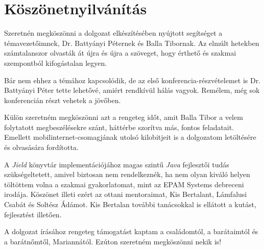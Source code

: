 \chapter*{Köszönetnyilvánítás}

Szeretnén megköszönni a dolgozat elkészítésében nyújtott segítséget a témavezetőimnek, Dr. Battyányi Péternek és Balla Tibornak. Az elmúlt hetekben számtalanszor olvasták át újra és újra a szöveget, hogy érthető és szakmai szempontból kifogástalan legyen. 

Bár nem ehhez a témához kapcsolódik, de az első konferencia-részvételemet is Dr. Battyányi Péter tette lehetővé, amiért rendkívül hálás vagyok. Remélem, még sok konferencián részt vehetek a jövőben.

Külön szeretném megköszönni azt a rengeteg időt, amit Balla Tibor a velem folytatott megbeszélésekre szánt, háttérbe szorítva más, fontos feladatait. Emellett mobilinternet-csomagjának utolsó kilobitjeit is a dolgozatom letöltésére és olvasására fordította.

A \textit{Jield} könyvtár implementációjához magas szintű \textit{Java} fejlesztői tudás szükségeltetett, amivel biztosan nem rendelkeznék, ha nem olyan kiváló helyen töltöttem volna a szakmai gyakorlatomat, mint az EPAM Systems debreceni irodája. Köszönet illeti ezért az ottani mentoraimat, Kis Bertalant, Lámfalusi Csabát és Soltész Ádámot. Kis Bertalan további tanácsokkal is ellátott a kutást, fejlesztést illetően.

A dolgozat írásához rengeteg támogatást kaptam a családomtól, a barátaimtól és a barátnőmtől, Mariannától. Ezúton szeretném megköszönni nekik is!
